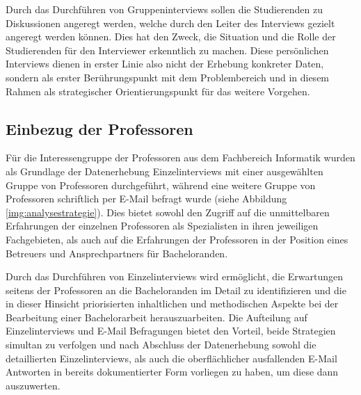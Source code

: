 \documentclass[bibliography=totoc,listof=totoc,BCOR=5mm,DIV=12,oneside]{scrbook}
\begin{document}
\newpage
\par Durch das Durchführen von Gruppeninterviews sollen die Studierenden zu Diskussionen angeregt werden, welche durch den Leiter des Interviews gezielt angeregt werden können. Dies hat den Zweck, die Situation und die Rolle der Studierenden für den Interviewer erkenntlich zu machen.  Diese persönlichen Interviews dienen in erster Linie also nicht der Erhebung konkreter Daten, sondern als erster Berührungspunkt mit dem Problembereich und in diesem Rahmen als strategischer Orientierungspunkt für das weitere Vorgehen.

\subsection{Einbezug der Professoren}
\par Für die Interessengruppe der Professoren aus dem Fachbereich Informatik wurden als Grundlage der Datenerhebung Einzelinterviews mit einer ausgewählten Gruppe von Professoren durchgeführt, während eine weitere Gruppe von Professoren schriftlich per E-Mail befragt wurde (siehe Abbildung \ref{img:analysestrategie}). Dies bietet sowohl den Zugriff auf die unmittelbaren Erfahrungen der einzelnen Professoren als Spezialisten in ihren jeweiligen Fachgebieten, als auch auf die Erfahrungen der Professoren in der Position eines Betreuers und Ansprechpartners für Bacheloranden. 
\par \bigskip Durch das Durchführen von Einzelinterviews wird ermöglicht, die Erwartungen seitens der Professoren an die Bacheloranden im Detail zu identifizieren und die in dieser Hinsicht priorisierten inhaltlichen und methodischen Aspekte bei der Bearbeitung einer Bachelorarbeit herauszuarbeiten. Die Aufteilung auf Einzelinterviews und E-Mail Befragungen bietet den Vorteil, beide Strategien simultan zu verfolgen und nach Abschluss der Datenerhebung sowohl die detaillierten Einzelinterviews, als auch die oberflächlicher ausfallenden E-Mail Antworten in bereits dokumentierter Form vorliegen zu haben, um diese dann auszuwerten.
\end{document}
